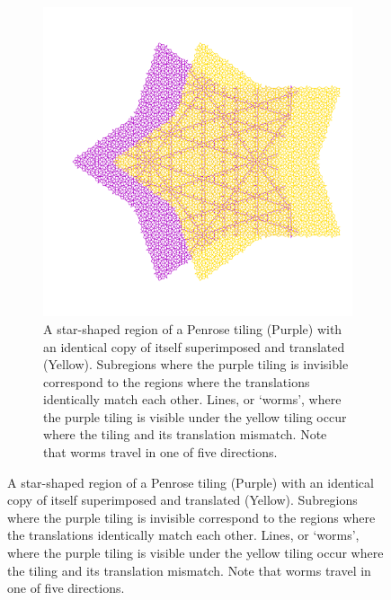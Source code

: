 \documentclass[
  oneside,
  11pt, a4paper,
  footinclude=true,
  headinclude=true,
  cleardoublepage=empty
]{scrbook}
\begin{document}
\begin{figure}[H]
\centering
\begin{subfigure}{0.8\textwidth}
\includegraphics[width=\textwidth]{TranslateFar}
\caption{A star-shaped region of a Penrose tiling (Purple) with an identical copy of itself superimposed and translated (Yellow). Subregions where the purple tiling is invisible correspond to the regions where the translations identically match each other. Lines, or `worms', where the purple tiling is visible under the yellow tiling occur where the tiling and its translation mismatch. Note that worms travel in one of five directions.}
\label{fig:far}
\end{subfigure}


\end{figure}
\end{document}
